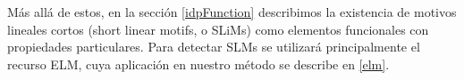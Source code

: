 



Más allá de estos, en la sección \ref{idpFunction} describimos la existencia de motivos lineales cortos (short linear motifs, o SLiMs) como elementos funcionales con propiedades particulares.  
Para detectar SLMs se utilizará principalmente el recurso ELM, cuya aplicación en nuestro método se describe en \ref{elm}.

